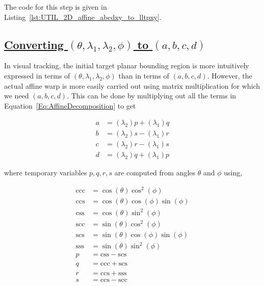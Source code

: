 The code for this step is given in Listing~\ref{lst:UTIL_2D_affine_abcdxy_to_lltpxy}.

\subsection{\underline{Converting  $(\theta, \lambda_1, \lambda_2, \phi)$ to $(a, b, c, d)$}}
In visual tracking, the initial target planar bounding region is more intuitively expressed in terms of $(\theta, \lambda_1, \lambda_2, \phi)$ than in terms of $(a, b, c, d)$.  However, the actual affine warp is more easily carried out using matrix multiplication for which we need $(a, b, c, d)$.  This can be done by multiplying out all the terms in Equation~\ref{Eq:AffineDecomposition} to get

\begin{equation}
\boxed{
\begin{array}{llll}
a &= (\lambda_2) p + (\lambda_1) q\\
b &= (\lambda_2) s  - (\lambda_1) r \\
c &= (\lambda_2) r  - (\lambda_1) s \\
d &= (\lambda_2)q + (\lambda_1) p
\end{array}}
\end{equation}



where temporary variables $p, q, r, s$ are computed from angles $\theta$ and $\phi$ using,

\begin{equation*}
\begin{array}{llll}
\mathrm{ccc} &= \cos(\theta) \cos^2(\phi)\\
\mathrm{ccs} &= \cos(\theta) \cos(\phi) \sin(\phi)\\
\mathrm{css} &= \cos(\theta) \sin^2(\phi)\\
\mathrm{scc} &= \sin(\theta) \cos^2(\phi) \\
\mathrm{scs} &= \sin(\theta) \cos(\phi) \sin(\phi)\\
\mathrm{sss} &= \sin(\theta) \sin^2(\phi)\\
p   &=  \mathrm{css} - \mathrm{scs}\\
q   &=  \mathrm{ccc} + \mathrm{scs}\\
r   &= \mathrm{ccs} + \mathrm{sss}\\
s   &=  \mathrm{ccs} - \mathrm{scc}\\
\end{array}
\end{equation*}

